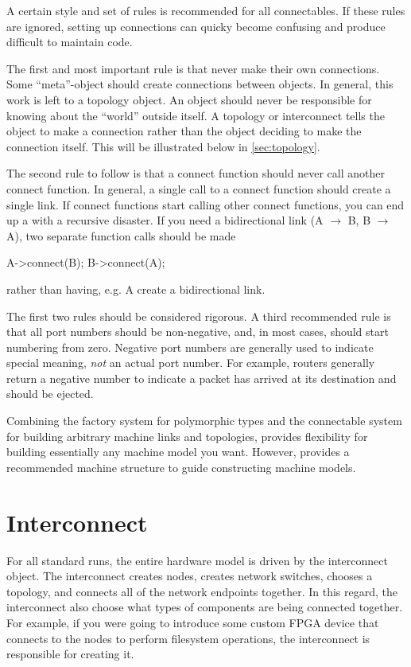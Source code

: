 A certain style and set of rules is recommended for all connectables.
If these rules are ignored, setting up connections can quicky become confusing and produce difficult to maintain code.

The first and most important rule is that  never make their own connections.
Some ``meta''-object should create connections between objects.
In general, this work is left to a topology object.
An object should never be responsible for knowing about the ``world'' outside itself.
A topology or interconnect tells the object to make a connection rather than the object deciding to make the connection itself.
This will be illustrated below in \ref{sec:topology}.

The second rule to follow is that a connect function should never call another connect function.
In general, a single call to a connect function should create a single link.
If connect functions start calling other connect functions, you can end up a with a recursive disaster.
If you need a bidirectional link (A $\rightarrow$ B, B $\rightarrow$ A),
two separate function calls should be made

\begin{CppCode}
A->connect(B);
B->connect(A);
\end{CppCode}

rather than having, e.g. A create a bidirectional link.

The first two rules should be considered rigorous. 
A third recommended rule is that all port numbers should be non-negative, and, in most cases, should start numbering from zero.
Negative port numbers are generally used to indicate special meaning, \emph{not} an actual port number.
For example, routers generally return a negative number to indicate a packet has arrived at its destination and should be ejected.

Combining the factory system for polymorphic types and the connectable system for building arbitrary machine links and topologies,
\sstmacro provides flexibility for building essentially any machine model you want.
However, \sstmacro provides a recommended machine structure to guide constructing machine models.

\section{Interconnect}
For all standard runs, the entire hardware model is driven by the interconnect object.
The interconnect creates nodes, creates network switches, chooses a topology, and connects all of the network endpoints together.
In this regard, the interconnect also choose what types of components are being connected together.
For example, if you were going to introduce some custom FPGA device that connects to the nodes to perform filesystem operations,
the interconnect is responsible for creating it.

